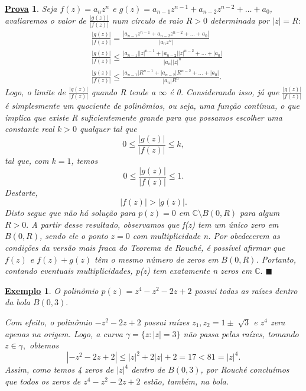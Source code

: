 \documentclass{article}
\newtheorem{example}{\underline{Exemplo}}[section]
\newtheorem*{proof*}{\underline{Prova}}
\renewcommand\qedsymbol{$\blacksquare$}
\begin{document}
  \begin{proof*}
    Seja \(f(z) = a_{n}z^{n}\) e \(g(z) = a_{n-1}z^{n-1}+a_{n-2}z^{n-2}+\dotsc +a_{0}\), avaliaremos o valor de \(\frac{|g(z)|}{|f(z)|}\) num círculo de raio \(R > 0\) determinada por \(|z| = R:\)
    \begin{align*}
    &\frac{|g(z)|}{|f(z)|} = \frac{|a_{n-1}z^{n-1} + a_{n-2}z^{n-2}+\dotsc +a_{0}|}{|a_{n}z^{n}|}\\
    &\frac{|g(z)|}{|f(z)|} \leq \frac{|a_{n-1}||z|^{n-1} + |a_{n-2}||z|^{n-2}+\dotsc +|a_{0}|}{|a_{n}||z|^{n}}\\
    &\frac{|g(z)|}{|f(z)|} \leq \frac{|a_{n-1}|R^{n-1}+|a_{n-2}|R^{n-2}+\dotsc +|a_{0}|}{|a_{n}|R^{n}}.
    \end{align*}
    Logo, o limite de \(\frac{|g(z)|}{|f(z)|}\) quando R tende a \(\infty\) é 0. Considerando isso, já que \(\frac{|g(z)|}{|f(z)|}\) é simplesmente um quociente de polinômios, ou seja,
    uma função contínua, o que implica que existe R suficientemente grande para que possamos escolher uma constante real \(k > 0\) qualquer tal que 
    \[
      0\leq \frac{|g(z)|}{|f(z)|}\leq k,
    \]
    tal que, com \(k=1\), temos 
    \[
      0 \leq \frac{|g(z)|}{|f(z)|}\leq 1.
    \]
    Destarte, 
    \[
      |f(z)| > |g(z)|.
    \]
    Disto segue que não há solução para \(p(z) = 0\) em \(\mathbb{C}\setminus{B(0, R)}\) para algum \(R > 0.\) A partir desse resultado, observamos que f(z) tem um único zero em \(B(0, R)\), sendo ele o ponto
    \(z=0\) com multiplicidade n. Por obedecerem as condições da versão mais fraca do Teorema de Rouché, é possível afirmar que \(f(z)\) e \(f(z) + g(z)\) têm o mesmo número de zeros em \(B(0, R)\). Portanto,
    contando eventuais multiplicidades, p(z) tem exatamente n zeros em \(\mathbb{C}.\) \qedsymbol
  \end{proof*}
  \begin{example}
    O polinômio \(p(z) = z^{4} - z^{2} - 2z + 2\) possui todas as raízes dentro da bola \(B(0, 3).\)

    Com efeito, o polinômio \(-z^{2} - 2z + 2\) possui raízes \(z_{1}, z_{2} = 1\pm \sqrt[]{3}\) e \(z^{4}\) zera apenas na origem. Logo, a curva \(\gamma  = \{z: |z| = 3\}\) não passa pelas raízes, tomando
    \(z\in \gamma ,\) obtemos 
    \[
      |-z^{2} - 2z + 2| \leq |z|^{2} + 2|z| + 2 = 17 < 81 = |z|^{4}.
    \]
    Assim, como temos 4 zeros de \(|z|^{4}\) dentro de \(B(0, 3)\), por Rouché concluímos que todos os zeros de \(z^{4}-z^{2}-2z + 2\) estão, também, na bola.
\end{example}  
  \newpage
  
\end{document}
